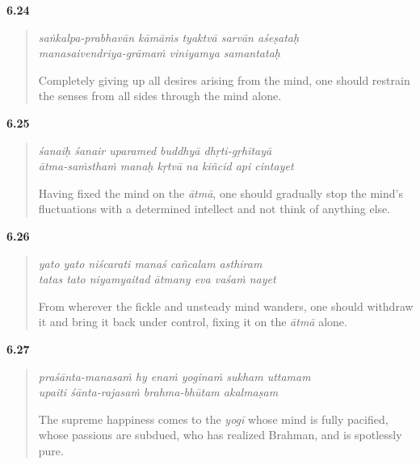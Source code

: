 \par\noindent\textbf{6.24}\par
\begin{verse}
\textit{saṅkalpa-prabhavān kāmāṁs tyaktvā sarvān aśeṣataḥ} \\
\textit{manasaivendriya-grāmaṁ viniyamya samantataḥ}

\noindent Completely giving up all desires arising from the mind, one should restrain the senses from all sides through the mind alone.
\end{verse}
\par



\par\noindent\textbf{6.25}\par
\begin{verse}
\textit{śanaiḥ śanair uparamed buddhyā dhṛti-gṛhītayā} \\
\textit{ātma-saṁsthaṁ manaḥ kṛtvā na kiñcid api cintayet}

\noindent Having fixed the mind on the \textit{ātmā}, one should gradually stop the mind's fluctuations with a determined intellect and not think of anything else.
\end{verse}
\par



\par\noindent\textbf{6.26}\par
\begin{verse}
\textit{yato yato niścarati manaś cañcalam asthiram} \\
\textit{tatas tato niyamyaitad ātmany eva vaśaṁ nayet}

\noindent From wherever the fickle and unsteady mind wanders, one should withdraw it and bring it back under control, fixing it on the \textit{ātmā} alone.
\end{verse}
\par



\par\noindent\textbf{6.27}\par
\begin{verse}
\textit{praśānta-manasaṁ hy enaṁ yoginaṁ sukham uttamam} \\
\textit{upaiti śānta-rajasaṁ brahma-bhūtam akalmaṣam}

\noindent The supreme happiness comes to the \textit{yogī} whose mind is fully pacified, whose passions are subdued, who has realized Brahman, and is spotlessly pure.
\end{verse}
\par



